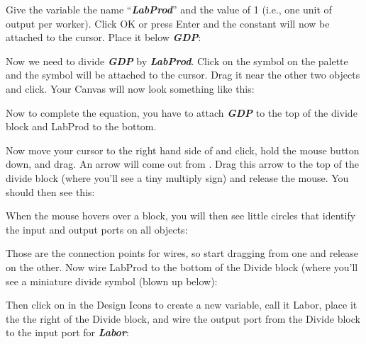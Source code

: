 Give the variable the name ``{\em\bf LabProd}'' and the value of 1
(i.e., one unit of output per worker). Click OK or press Enter and the
constant   will now be attached to the
cursor. Place it below {\em\bf GDP}: 

\begin{center}
\end{center}

Now we need to divide {\em\bf GDP} by {\em\bf LabProd}. Click on the
 symbol on the palette and the symbol will
be attached to the cursor. Drag it near the other two objects and
click. Your Canvas will now look something like this: 

\begin{center}
\end{center}

Now to complete the equation, you have to attach {\em\bf GDP}  to the top of the
divide block and LabProd to the bottom.

Now move your cursor to the right hand side of
  and click, hold the mouse button down, and
drag. An arrow will come out from  . Drag
this arrow to the top of the divide block (where you'll see a tiny
multiply sign) and release the mouse. You should then see this: 

\begin{center}
\end{center}


When the mouse hovers over a block, you will then see little
circles that identify the input and output ports on all objects: 

\begin{center}
\end{center}

Those are the connection points for wires, so start dragging from one
and release on the other. Now wire LabProd to the bottom of the Divide
block (where you'll see a miniature divide symbol (blown up below): 

\begin{center}
\end{center}

Then click on  in the Design Icons to create a new variable, call it
Labor, place it the the right of the Divide block, and wire the output port from the Divide block to the
input port for {\bf\em Labor}: 

